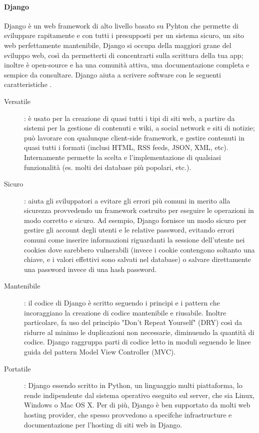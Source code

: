 \paragraph{Django}
Django è un web framework di alto livello basato su Pyhton che permette di sviluppare rapitamente e con tutti i presupposti per un sistema sicuro, un sito web
perfettamente mantenibile, Django si occupa della maggiori grane del sviluppo web, così da permetterti di concentrarti sulla scrittura della tua app; inoltre 
è open-source e ha una comunità attiva, una documentazione completa e sempice da consultare.\hfill\break
Django aiuta a scrivere software con le seguenti caratteristiche \cite{django-documentation}.
\begin{description}
    \item[Versatile]: è usato per la creazione di quasi tutti i tipi di siti web, a partire da sistemi per la gestione di contenuti e wiki,
    a social network e siti di notizie; può lavorare con qualunque client-side framework, e gestire contenuti in quasi tutti i formati (inclusi HTML, 
    RSS feeds, JSON, XML, etc). Internamente permette la scelta e l'implementazione di qualsiasi funzionalità (es. molti dei database più popolari, etc.).
    \item[Sicuro]: aiuta gli sviluppatori a evitare gli errori più comuni in merito alla sicurezza provvedendo un framework costruito per eseguire 
    le operazioni in modo corretto e sicuro. Ad esempio, Django fornisce un modo sicuro per gestire gli account degli utenti e le relative 
    password, evitando errori comuni come inserire informazioni riguardanti la sessione dell'utente nei cookies dove sarebbero vulnerabili (invece i cookie 
    contengono soltanto una chiave, e i valori effettivi sono salvati nel database) o salvare direttamente una password invece di una hash password.
    \item[Mantenibile]: il codice di Django è scritto seguendo i principi e i pattern che incoraggiano la creazione di codice mantenibile e riusabile. Inoltre 
    particolare, fa uso del principio "Don't Repeat Yourself" (DRY) così da ridurre al minimo le duplicazioni non necessarie, diminuendo la quantità di codice.
    Django raggruppa parti di codice letto in moduli seguendo le linee guida del pattern Model View Controller (MVC).
    \item[Portatile]: Django essendo scritto in Python, un linguaggio multi piattaforma, lo rende indipendente dal sistema operativo eseguito sul server, che 
    sia Linux, Windows o Mac OS X. Per di più, Django è ben supportato da molti web hosting provider, che spesso provvedono a specifche infrastructure 
    e documentazione per l'hosting di siti web in Django.
\end{description}
